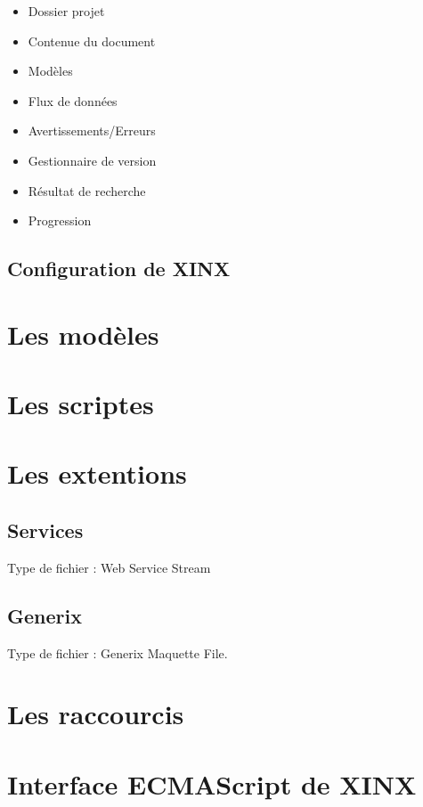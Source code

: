 \documentclass[a4paper,10pt,twoside]{book}
\begin{document}
\begin{itemize}
  \item Dossier projet
  \item Contenue du document
  \item Modèles
  \item Flux de données
  \item Avertissements/Erreurs
  \item Gestionnaire de version
  \item Résultat de recherche
  \item Progression
\end{itemize}

\section{Configuration de XINX}

\chapter{Les modèles}

\chapter{Les scriptes}
\label{sec:Scripts}

\chapter{Les extentions}

\section{Services}
\label{sec:Services}


Type de fichier : Web Service Stream


\section{Generix}
\label{sec:Generix}

Type de fichier : Generix Maquette File.

\appendix
\chapter{Les raccourcis}

\chapter{Interface ECMAScript de XINX}
\end{document}
